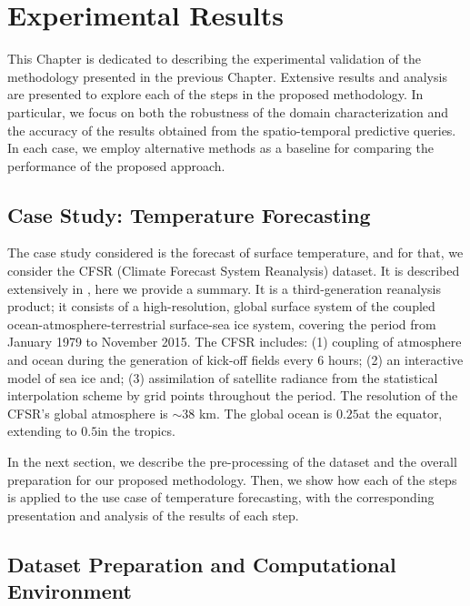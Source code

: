 \chapter{Experimental Results}
\label{chapter_Experimental_Results}

This Chapter is dedicated to describing the experimental validation of the methodology presented in the previous Chapter. Extensive results and analysis are presented to explore each of the steps in the proposed methodology. In particular, we focus on both the robustness of the domain characterization and the accuracy of the results obtained from the spatio-temporal predictive queries. In each case, we employ alternative methods as a baseline for comparing the performance of the proposed approach.

\section{Case Study: Temperature Forecasting}

The case study considered is the forecast of surface temperature, and for that, we consider the CFSR (Climate Forecast System Reanalysis) dataset. It is described extensively in \cite{Saha2010}, here we provide a summary. It is a third-generation reanalysis product; it consists of a high-resolution, global surface system of the coupled ocean-atmosphere-terrestrial surface-sea ice system, covering the period from January 1979 to November 2015. The CFSR includes: (1) coupling of atmosphere and ocean during the generation of kick-off fields every 6 hours; (2) an interactive model of sea ice and; (3) assimilation of satellite radiance from the statistical interpolation scheme by grid points throughout the period. The resolution of the CFSR's global atmosphere is $\sim 38$ km. The global ocean is $0.25$\textdegree at the equator, extending to $0.5$\textdegree in the tropics. 

In the next section, we describe the pre-processing of the dataset and the overall preparation for our proposed methodology. Then, we show how each of the steps is applied to the use case of temperature forecasting, with the corresponding presentation and analysis of the results of each step.

\section{Dataset Preparation and Computational Environment}
\label{sec:DatasetPreparation}

